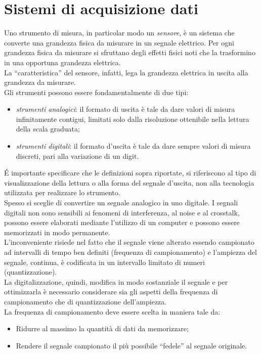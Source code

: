 \documentclass[12pt, letterpaper]{book}
\begin{document}
\section{Sistemi di acquisizione dati}
Uno strumento di misura, in particolar modo un \textit{sensore}, è un sistema che converte una grandezza fisica da misurare in un segnale elettrico. Per ogni grandezza fisica da misurare si sfruttano degli effetti fisici noti che la trasformino in una opportuna grandezza elettrica.\\ 
La “caratteristica” del
sensore, infatti, lega la grandezza elettrica in uscita alla grandezza da misurare.\\
Gli strumenti possono essere fondamentalmente di due tipi:
\begin{itemize}
    \item \textit{strumenti analogici}: il formato di uscita è tale da dare valori di misura infinitamente contigui, limitati solo dalla risoluzione ottenibile nella lettura della scala graduata;
    \item \textit{strumenti digitali}: il formato d'uscita è tale da dare sempre valori di misura discreti, pari alla variazione di un digit.
\end{itemize}
\'E importante specificare che le definizioni sopra riportate, si riferiscono al tipo di visualizzazione della lettura o alla forma del segnale d'uscita, non alla tecnologia utilizzata per realizzare lo strumento.\\
Spesso si sceglie di convertire un segnale analogico in uno digitale. I segnali digitali non sono sensibili ai fenomeni di interferenza, al noise e al crosstalk, possono essere elaborati mediante l'utilizzo di un computer e possono essere memorizzati in modo permanente.\\ 
L'inconveniente risiede nel fatto che il segnale viene alterato essendo campionato ad intervalli di tempo ben definiti (frequenza di campionamento) e l'ampiezza del segnale, continua, è codificata in un intervallo limitato di numeri (quantizzazione).\\
La digitalizzazione, quindi, modifica in modo sostanziale il segnale e per ottimizzarla è necessario considerare sia gli aspetti della frequenza di campionamento che di quantizzazione dell'ampiezza.\\
La frequenza di campionamento deve essere scelta in maniera tale da:
\begin{itemize}
    \item Ridurre al massimo la quantità di dati da memorizzare;
    \item Rendere il segnale campionato il più possibile “fedele” al segnale originale.
\end{itemize}
\end{document}
